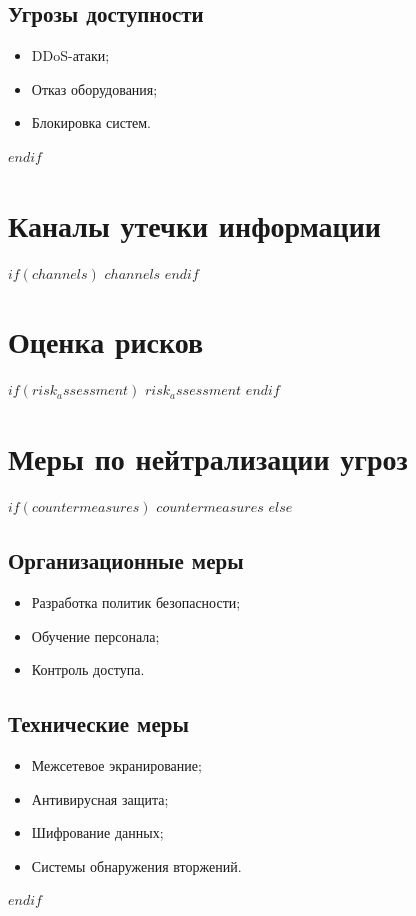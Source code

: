 \documentclass[14pt,a4paper]{extarticle}
\begin{document}
\subsection{Угрозы доступности}
\begin{itemize}
    \item DDoS-атаки;
    \item Отказ оборудования;
    \item Блокировка систем.
\end{itemize}
$endif$

\section{Каналы утечки информации}
\label{sec:channels}

$if(channels)$
$channels$
$endif$

\section{Оценка рисков}
\label{sec:risk_assessment}

$if(risk_assessment)$
$risk_assessment$
$endif$

\section{Меры по нейтрализации угроз}
\label{sec:countermeasures}

$if(countermeasures)$
$countermeasures$
$else$
\subsection{Организационные меры}
\begin{itemize}
    \item Разработка политик безопасности;
    \item Обучение персонала;
    \item Контроль доступа.
\end{itemize}

\subsection{Технические меры}
\begin{itemize}
    \item Межсетевое экранирование;
    \item Антивирусная защита;
    \item Шифрование данных;
    \item Системы обнаружения вторжений.
\end{itemize}
$endif$
\end{document}
